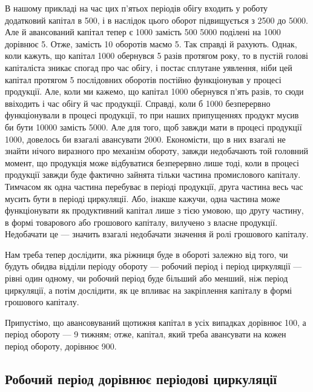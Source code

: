 В нашому прикладі на час цих п’ятьох періодів обігу входить у роботу
додатковий капітал в 500, і в наслідок цього оборот підвищується
з 2500 до 5000. Але й авансований капітал
тепер є 1000 замість 500 5000 поділені на 1000
дорівнює 5. Отже, замість 10 оборотів маємо 5. Так справді й рахують.
Однак, коли кажуть, що капітал 1000 обернувся 5 разів протягом
року, то в пустій голові капіталіста зникає спогад про час обігу,
і постає сплутане уявлення, ніби цей капітал протягом 5 послідовних
оборотів постійно функціонував у процесі продукції. Але, коли ми кажемо,
що капітал 1000 обернувся п’ять разів, то сюди ввіходить
і час обігу й час продукції. Справді, коли б 1000 безперервно
функціонували в процесі продукції, то при наших припущеннях продукт
мусив би бути 10000 замість 5000. Але для того, щоб завжди
мати в процесі продукції 1000, довелось би взагалі авансувати
2000. Економісти, що в них взагалі не знайти нічого виразного
про механізм обороту, завжди недобачають той головний момент, що
продукція може відбуватися безперервно лише тоді, коли в процесі продукції
завжди буде фактично зайнята тільки частина промислового капіталу.
Тимчасом як одна частина перебуває в періоді продукції, друга частина
весь час мусить бути в періоді циркуляції. Або, інакше кажучи, одна
частина може функціонувати як продуктивний капітал лише з тією умовою,
що другу частину, в формі товарового або грошового капіталу, вилучено
з власне продукції. Недобачати це — значить взагалі недобачати значення
й ролі грошового капіталу.

Нам треба тепер дослідити, яка ріжниця буде в обороті залежно від
того, чи будуть обидва відділи періоду обороту — робочий період і період
циркуляції — рівні один одному, чи робочий період буде більший
або менший, ніж період циркуляції, а потім дослідити, як це впливає на
закріплення капіталу в формі грошового капіталу.

Припустімо, що авансовуваний щотижня капітал в усіх випадках дорівнює
100, а період обороту — 9 тижням; отже, капітал, який
треба авансувати на кожен період обороту, дорівнює 900.

\subsection{Робочий період дорівнює періодові циркуляції}


